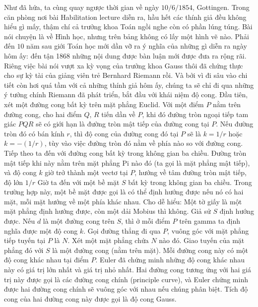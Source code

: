 \begin{multicols}{2}
	\vskip 0.1cm
	Như đã hứa, ta cùng quay ngược thời gian về ngày $10/6/1854$, Gottingen. Trong căn phòng nơi bài Habilitation lecture diễn ra, hầu hết các thính giả đều không hiểu gì mấy, thậm chí cả trưởng khoa Toán ngồi nghe còn có phần lúng túng. Bài nói chuyện là về Hình học, nhưng trên bảng không có lấy một hình vẽ nào. Phải đến $10$ năm sau giới Toán học mới dần vỡ ra ý nghĩa của những gì diễn ra ngày hôm ấy: đến tận 1868 những nội dung được bàn luận mới được đưa ra rộng rãi. Riêng việc bài nói vượt xa kỳ vọng của trưởng khoa Gauss thôi đã chứng thực cho sự kỳ tài của giảng viên trẻ Bernhard Riemann rồi. Và bởi vì đi sâu vào chi tiết còn hơi quá tầm với cả những thính giả hôm ấy, chúng ta sẽ chỉ đi qua những ý tưởng chính Riemann đã phát triển, bắt đầu với khái niệm độ cong.
	\vskip 0.1cm
	Đầu tiên, xét một đường cong bất kỳ trên mặt phẳng Euclid. Với một điểm $P$ nằm trên đường cong, cho hai điểm $Q$, $R$ tiến dần về $P$, khi đó đường tròn ngoại tiếp tam giác $PQR$ sẽ có giới hạn là đường tròn mật tiếp của đường cong tại $P$. Nếu đường tròn đó có bán kính $r$, thì độ cong của đường cong đó tại $P$ sẽ là $k = 1/r$ hoặc $k =  -(1/r)$, tùy vào việc đường tròn đó nằm về phía nào so với đường cong.
	\vskip 0.1cm
	Tiếp theo ta đến với đường cong bất kỳ trong không gian ba chiều. Đường tròn mật tiếp khi này nằm trên mặt phẳng Pi nào đó (ta gọi là mặt phẳng mật tiếp), và độ cong $k$ giờ trở thành một vectơ tại $P$, hướng về tâm đường tròn mật tiếp, độ lớn $1/r$
	\vskip 0.1cm
	Giờ ta đến với một bề mặt $S$ bất kỳ trong không gian ba chiều. Trong trường hợp này, một bề mặt được gọi là có thể định hướng được nếu nó có hai mặt, mỗi mặt hướng về một phía khác nhau. Cho dễ hiểu: Một tờ giấy là một mặt phẳng định hướng được, còn một dải Mobius thì không. Giả sử $S$ định hướng được. Nếu $d$ là một đường cong trên $S$, thì ở mỗi điểm $P$ trên gamma ta định nghĩa được một độ cong $k$.
	\vskip 0.1cm
	Gọi đường thẳng đi qua $P$, vuông góc với mặt phẳng tiếp tuyến tại $P$ là $N$. Xét một mặt phẳng chứa $N$ nào đó. Giao tuyến của mặt phẳng đó với $S$ là một đường cong (nằm trên mặt). Mỗi đường cong này có một độ cong khác nhau tại điểm $P$. Euler đã chứng minh những độ cong khác nhau này có giá trị lớn nhất và giá trị nhỏ nhất. Hai đường cong tương ứng với hai giá trị này được gọi là các đường cong chính (principle curve), và Euler chứng minh được hai đường cong chính sẽ vuông góc với nhau nếu chúng phân biệt. Tích độ cong của hai đường cong này được gọi là độ cong Gauss. 
	\begin{figure}[H]
		\vspace*{5pt}

\end{figure}
\end{multicols}
